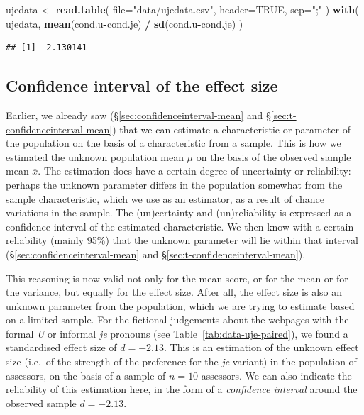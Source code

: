 \documentclass[
]{book}
\newenvironment{Shaded}{\begin{snugshade}}{\end{snugshade}}
\newcommand{\DataTypeTok}[1]{\textcolor[rgb]{0.13,0.29,0.53}{#1}}
\newcommand{\KeywordTok}[1]{\textcolor[rgb]{0.13,0.29,0.53}{\textbf{#1}}}
\newcommand{\NormalTok}[1]{#1}
\newcommand{\OperatorTok}[1]{\textcolor[rgb]{0.81,0.36,0.00}{\textbf{#1}}}
\newcommand{\OtherTok}[1]{\textcolor[rgb]{0.56,0.35,0.01}{#1}}
\newcommand{\StringTok}[1]{\textcolor[rgb]{0.31,0.60,0.02}{#1}}
\begin{document}
\begin{Shaded}
\begin{Highlighting}[]
\NormalTok{ujedata \textless{}{-}}\StringTok{ }\KeywordTok{read.table}\NormalTok{( }\DataTypeTok{file=}\StringTok{"data/ujedata.csv"}\NormalTok{, }\DataTypeTok{header=}\OtherTok{TRUE}\NormalTok{, }\DataTypeTok{sep=}\StringTok{";"}\NormalTok{ )}
\KeywordTok{with}\NormalTok{( ujedata, }\KeywordTok{mean}\NormalTok{(cond.u}\OperatorTok{{-}}\NormalTok{cond.je) }\OperatorTok{/}\StringTok{ }\KeywordTok{sd}\NormalTok{(cond.u}\OperatorTok{{-}}\NormalTok{cond.je) )}
\end{Highlighting}
\end{Shaded}

\begin{verbatim}
## [1] -2.130141
\end{verbatim}

\hypertarget{confidence-interval-of-the-effect-size}{%
\subsection{Confidence interval of the effect size}\label{confidence-interval-of-the-effect-size}}

Earlier, we already saw
(§\ref{sec:confidenceinterval-mean} and
§\ref{sec:t-confidenceinterval-mean})
that we can estimate a characteristic
or parameter of the population on the basis of a characteristic
from a sample. This is how we estimated the unknown population mean \(\mu\)
on the basis of the observed sample mean
\(\overline{x}\). The estimation does have a certain degree of
uncertainty or reliability: perhaps the unknown parameter differs
in the population somewhat from the sample characteristic,
which we use as an estimator, as a result of chance variations in the
sample. The (un)certainty and (un)reliability is expressed as
a confidence interval of the estimated characteristic. We then know
with a certain reliability (mainly 95\%) that the unknown parameter
will lie within that interval
(§\ref{sec:confidenceinterval-mean} and §\ref{sec:t-confidenceinterval-mean}).

This reasoning is now valid not only for the mean score, or for the mean or for the
variance, but equally for the effect size. After all, the effect size
is also an unknown parameter from the population, which we are trying to estimate
based on a limited sample. For the fictional judgements
about the webpages with the formal \emph{U} or informal \emph{je} pronouns (see
Table~\ref{tab:data-uje-paired}), we found a standardised effect size
of \(d=-2.13\). This is an estimation of the unknown
effect size (i.e.~of the strength of the preference for the \emph{je}-variant)
in the population of assessors, on the basis of a sample of \(n=10\)
assessors. We can also indicate the reliability of this estimation
here, in the form of a \emph{confidence interval} around the
observed sample \(d=-2.13\).
\end{document}
